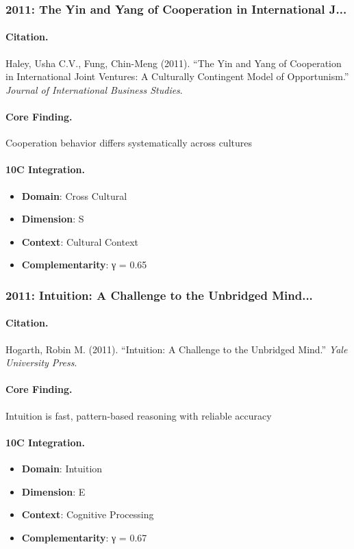 \subsubsection{2011: The Yin and Yang of Cooperation in International J...}

\paragraph{Citation.}
Haley, Usha C.V., Fung, Chin-Meng (2011). ``The Yin and Yang of Cooperation in International Joint Ventures: A Culturally Contingent Model of Opportunism.''
\textit{Journal of International Business Studies}.

\paragraph{Core Finding.}
Cooperation behavior differs systematically across cultures

\paragraph{10C Integration.}
\begin{itemize}[nosep]
  \item \textbf{Domain}: Cross Cultural
  \item \textbf{Dimension}: S
  \item \textbf{Context}: Cultural Context
  \item \textbf{Complementarity}: γ = 0.65
\end{itemize}

\subsubsection{2011: Intuition: A Challenge to the Unbridged Mind...}

\paragraph{Citation.}
Hogarth, Robin M. (2011). ``Intuition: A Challenge to the Unbridged Mind.''
\textit{Yale University Press}.

\paragraph{Core Finding.}
Intuition is fast, pattern-based reasoning with reliable accuracy

\paragraph{10C Integration.}
\begin{itemize}[nosep]
  \item \textbf{Domain}: Intuition
  \item \textbf{Dimension}: E
  \item \textbf{Context}: Cognitive Processing
  \item \textbf{Complementarity}: γ = 0.67
\end{itemize}

